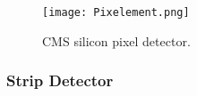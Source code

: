 \begin{figure}[!hbt]
    \begin{center}
        \texttt{[image: Pixelement.png]}
        \caption{CMS silicon pixel detector.}
        \label{fig:Pixelement}
    \end{center}
\end{figure}




\subsubsection{Strip Detector}


